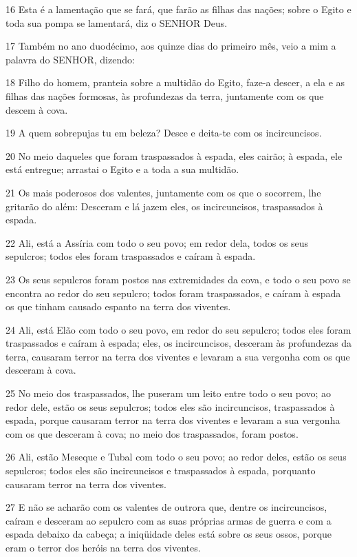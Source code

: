 \par 16 Esta é a lamentação que se fará, que farão as filhas das nações; sobre o Egito e toda sua pompa se lamentará, diz o SENHOR Deus.
\par 17 Também no ano duodécimo, aos quinze dias do primeiro mês, veio a mim a palavra do SENHOR, dizendo:
\par 18 Filho do homem, pranteia sobre a multidão do Egito, faze-a descer, a ela e as filhas das nações formosas, às profundezas da terra, juntamente com os que descem à cova.
\par 19 A quem sobrepujas tu em beleza? Desce e deita-te com os incircuncisos.
\par 20 No meio daqueles que foram traspassados à espada, eles cairão; à espada, ele está entregue; arrastai o Egito e a toda a sua multidão.
\par 21 Os mais poderosos dos valentes, juntamente com os que o socorrem, lhe gritarão do além: Desceram e lá jazem eles, os incircuncisos, traspassados à espada.
\par 22 Ali, está a Assíria com todo o seu povo; em redor dela, todos os seus sepulcros; todos eles foram traspassados e caíram à espada.
\par 23 Os seus sepulcros foram postos nas extremidades da cova, e todo o seu povo se encontra ao redor do seu sepulcro; todos foram traspassados, e caíram à espada os que tinham causado espanto na terra dos viventes.
\par 24 Ali, está Elão com todo o seu povo, em redor do seu sepulcro; todos eles foram traspassados e caíram à espada; eles, os incircuncisos, desceram às profundezas da terra, causaram terror na terra dos viventes e levaram a sua vergonha com os que desceram à cova.
\par 25 No meio dos traspassados, lhe puseram um leito entre todo o seu povo; ao redor dele, estão os seus sepulcros; todos eles são incircuncisos, traspassados à espada, porque causaram terror na terra dos viventes e levaram a sua vergonha com os que desceram à cova; no meio dos traspassados, foram postos.
\par 26 Ali, estão Meseque e Tubal com todo o seu povo; ao redor deles, estão os seus sepulcros; todos eles são incircuncisos e traspassados à espada, porquanto causaram terror na terra dos viventes.
\par 27 E não se acharão com os valentes de outrora que, dentre os incircuncisos, caíram e desceram ao sepulcro com as suas próprias armas de guerra e com a espada debaixo da cabeça; a iniqüidade deles está sobre os seus ossos, porque eram o terror dos heróis na terra dos viventes.
